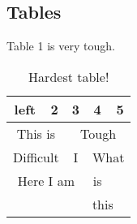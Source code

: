 \documentclass{article}
\begin{document}
\subsection*{Tables}
Table 1 is very tough.
\begin{table}[h]
    \centering
    \begin{tabular}{|c|c|c|c|c|}
        \hline
        left & 2 & 3 & 4 & 5 \\
        \hline
        \multicolumn{2}{c}{This is} & \multicolumn{3}{c}{Tough} \\
        \cline{3-5}
        \multicolumn{2}{c}{Difficult} & I & \multicolumn{2}{|c|}{What} \\
        \cline{1-3}
        \multicolumn{3}{|c|}{Here I am} & \multicolumn{1}{|c}{is} & \multicolumn{1}{c|}{}\\
        \hline
        \multicolumn{3}{c}{} & \multicolumn{2}{l}{this}\\
    \end{tabular}
    \vspace{-1em}
    \caption{Hardest table!}
    \label{tab:my_label}
\end{table}
\end{document}
